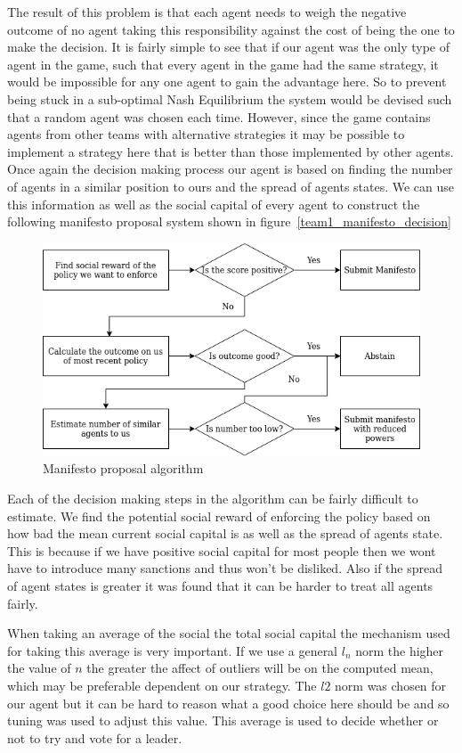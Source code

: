 The result of this problem is that each agent needs to weigh the negative outcome of no agent taking this responsibility against the cost of being the one to make the decision. It is fairly simple to see that if our agent was the only type of agent in the game, such that every agent in the game had the same strategy, it would be impossible for any one agent to gain the advantage here. So to prevent being stuck in a sub-optimal Nash Equilibrium the system would be devised such that a random agent was chosen each time. However, since the game contains agents from other teams with alternative strategies it may be possible to implement a strategy here that is better than those implemented by other agents. Once again the decision making process our agent is based on finding the number of agents in a similar position to ours and the spread of agents states. We can use this information as well as the social capital of every agent to construct the following manifesto proposal system shown in figure~\ref{team1_manifesto_decision}

\begin{figure}[!h]
    \centering
    \includegraphics[width=0.75\linewidth]{004_team_1_agent_design/images/mainfestostrategy.png}
    \caption{Manifesto proposal algorithm}
    \label{fig:team1_manifesto_decision}
\end{figure}

Each of the decision making steps in the algorithm can be fairly difficult to estimate. We find the potential social reward of enforcing the policy based on how bad the mean current social capital is as well as the spread of agents state. This is because if we have positive social capital for most people then we wont have to introduce many sanctions and thus won't be disliked. Also if the spread of agent states is greater it was found that it can be harder to treat all agents fairly. 

When taking an average of the social the total social capital the mechanism used for taking this average is very important. If we use a general $l_n$ norm the higher the value of $n$ the greater the affect of outliers will be on the computed mean, which may be preferable dependent on our strategy. The $l2$ norm was chosen for our agent but it can be hard to reason what a good choice here should be and so tuning was used to adjust this value. This average is used to decide whether or not to try and vote for a leader.

